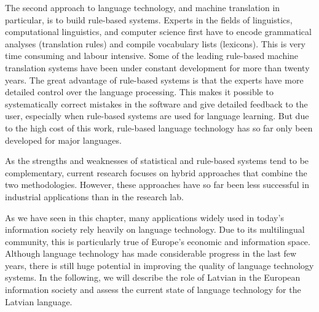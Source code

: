 \begin{multicols}{2}
The second approach to language technology, and machine translation in particular, is to build rule-based systems.  Experts in the fields of linguistics, computational linguistics, and computer science first have to encode grammatical analyses (translation rules) and compile vocabulary lists (lexicons).  This is very time consuming and labour intensive.  Some of the leading rule-based machine translation systems have been under constant development for more than twenty years.  The great advantage of rule-based systems is that the experts have more detailed control over the language processing.  This makes it possible to systematically correct mistakes in the software and give detailed feedback to the user, especially when rule-based systems are used for language learning.  But due to the high cost of this work, rule-based language technology has so far only been developed for major languages.

As the strengths and weaknesses of statistical and rule-based systems tend to be complementary, current research focuses on hybrid approaches that combine the two methodologies.  However, these approaches have so far been less successful in industrial applications than in the research lab.

As we have seen in this chapter, many applications widely used in today's information society rely heavily on language technology.  Due to its multilingual community, this is particularly true of Europe's economic and information space.  Although language technology has made considerable progress in the last few years, there is still huge potential in improving the quality of language technology systems.  In the following, we will describe the role of Latvian in the European information society and assess the current state of language technology for the Latvian language.  
\end{multicols}

\clearpage



